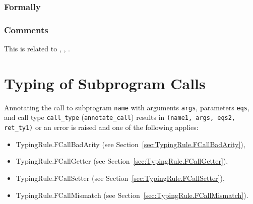 \documentclass{book}
\newcommand\astlabel[0]{\textsf{label}}
\newcommand\name[0]{\texttt{name}}
\newcommand\annotateblock[1]{\texttt{annotate\_block}(#1)}
\newcommand\annotatecatcher[1]{\texttt{annotate\_catcher}(#1)}
\newcommand\checkvarnotinenv[1]{\texttt{check\_var\_not\_in\_env}(#1)}
\newcommand\tenv[0]{\texttt{env}}
\newcommand\tty[0]{\texttt{ty}}
\begin{document}
\begin{emptyformal}
    \subsection{Formally}
\end{emptyformal}

\subsection{Comments}
    This is related to , , .

\chapter{Typing of Subprogram Calls \label{ch:TypingSubprogramCalls}}

Annotating the call to subprogram \texttt{name} with arguments \texttt{args},
parameters \texttt{eqs}, and call type \texttt{call\_type} (\texttt{annotate\_call}) results in \texttt{(name1,
args, eqs2, ret\_ty1)} or an error is raised and one of the following applies:
\begin{itemize}
\item TypingRule.FCallBadArity (see Section~\ref{sec:TypingRule.FCallBadArity}),
\item TypingRule.FCallGetter (see Section~\ref{sec:TypingRule.FCallGetter}),
\item TypingRule.FCallSetter (see Section~\ref{sec:TypingRule.FCallSetter}),
\item TypingRule.FCallMismatch (see Section~\ref{sec:TypingRule.FCallMismatch}).
\end{itemize}
\end{document}
